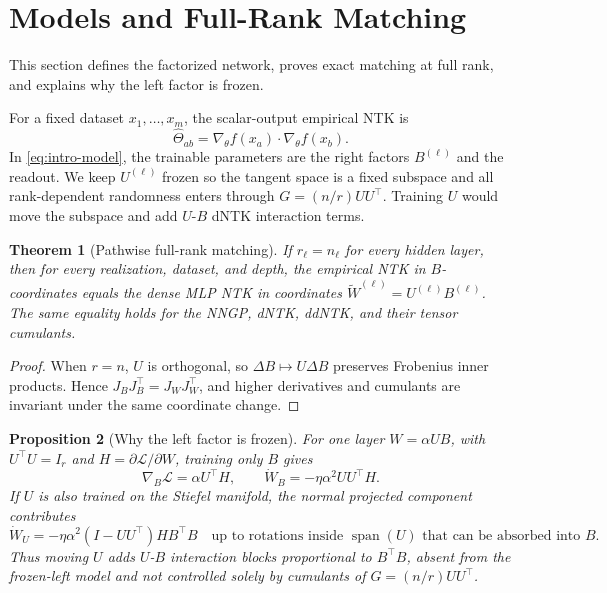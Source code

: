 \documentclass{article}
\newtheorem{theorem}{Theorem}[section]
\newtheorem{proposition}[theorem]{Proposition}
\newcommand{\wh}{\widehat}
\newcommand{\wt}{\widetilde}
\begin{document}
\section{Models and Full-Rank Matching}
This section defines the factorized network, proves exact matching at full rank, and explains why the left factor is frozen.

For a fixed dataset \(x_1,\ldots,x_m\), the scalar-output empirical NTK is
\begin{equation}
\wh\Theta_{ab}=\nabla_\theta f(x_a)\cdot \nabla_\theta f(x_b).
\end{equation}
In \eqref{eq:intro-model}, the trainable parameters are the right factors \(B^{(\ell)}\) and the readout. We keep \(U^{(\ell)}\) frozen so the tangent space is a fixed subspace and all rank-dependent randomness enters through \(G=(n/r)UU^\top\). Training \(U\) would move the subspace and add \(U\)-\(B\) dNTK interaction terms.

\begin{theorem}[Pathwise full-rank matching]
\label{thm:pathwise}
If \(r_\ell=n_\ell\) for every hidden layer, then for every realization, dataset, and depth, the empirical NTK in \(B\)-coordinates equals the dense MLP NTK in coordinates \(\wt W^{(\ell)}=U^{(\ell)}B^{(\ell)}\). The same equality holds for the NNGP, dNTK, ddNTK, and their tensor cumulants.
\end{theorem}

\begin{proof}
When \(r=n\), \(U\) is orthogonal, so \(\Delta B\mapsto U\Delta B\) preserves Frobenius inner products. Hence \(J_BJ_B^\top=J_WJ_W^\top\), and higher derivatives and cumulants are invariant under the same coordinate change.
\end{proof}

\begin{proposition}[Why the left factor is frozen]
\label{prop:frozen-left}
For one layer \(W=\alpha UB\), with \(U^\top U=I_r\) and \(H=\partial \mathcal L/\partial W\), training only \(B\) gives
\begin{equation}
\nabla_B\mathcal L=\alpha U^\top H,
\qquad
\dot W_B=-\eta\alpha^2UU^\top H.
\label{eq:frozen-left-flow}
\end{equation}
If \(U\) is also trained on the Stiefel manifold, the normal projected component contributes
\begin{equation}
\dot W_U
=-\eta\alpha^2 (I-UU^\top)H B^\top B
\quad
\text{up to rotations inside } \operatorname{span}(U)\text{ that can be absorbed into }B.
\label{eq:moving-left-flow}
\end{equation}
Thus moving \(U\) adds \(U\)-\(B\) interaction blocks proportional to \(B^\top B\), absent from the frozen-left model and not controlled solely by cumulants of \(G=(n/r)UU^\top\).
\end{proposition}
\end{document}
